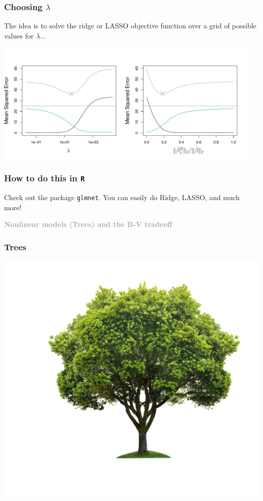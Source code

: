 \documentclass{beamer}
\newcommand{\bo}[1]{\textcolor{burntorange}{#1}}
\newcommand{\dg}[1]{\textcolor{darkgray}{#1}}
\newcommand{\sk}{\vspace{.5cm}}
\begin{document}
\begin{frame}
\frametitle{Choosing $\lambda$}
The idea is to solve the ridge or LASSO objective function over a grid of possible values for $\lambda$...


\hspace*{-8mm}\includegraphics[width=5in]{6_5.pdf}


\end{frame}


\begin{frame}
	\frametitle{How to do this in {\tt R}}
	
	Check out the package {\tt glmnet}.  You can easily do \bo{Ridge}, \bo{LASSO}, and much more!
	
\end{frame}


\begin{frame}

\sk\sk
\dg{\Large \bf Nonlinear models (Trees) and the B-V tradeoff}
\end{frame}

\begin{frame}
	\frametitle{Trees}
\vspace{0mm}
\hspace*{-2mm}
\includegraphics[scale=.88]{treepic}

\end{frame}
\end{document}

